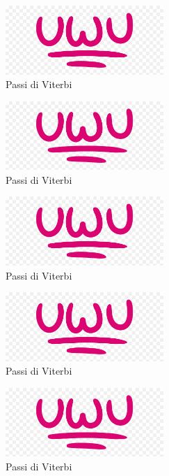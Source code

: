            \begin{figure}[H]
                \centering
                \includegraphics[width = 6cm]{media/uwu.png}
                \caption{Passi di Viterbi}
            \end{figure}
            \begin{figure}[H]
                \centering
                \includegraphics[width = 6cm]{media/uwu.png}
                \caption{Passi di Viterbi}
            \end{figure}
            \begin{figure}[H]
                \centering
                \includegraphics[width = 6cm]{media/uwu.png}
                \caption{Passi di Viterbi}
            \end{figure}
            \begin{figure}[H]
                \centering
                \includegraphics[width = 6cm]{media/uwu.png}
                \caption{Passi di Viterbi}
            \end{figure}
            \begin{figure}[H]
                \centering
                \includegraphics[width = 6cm]{media/uwu.png}
                \caption{Passi di Viterbi}
            \end{figure}
